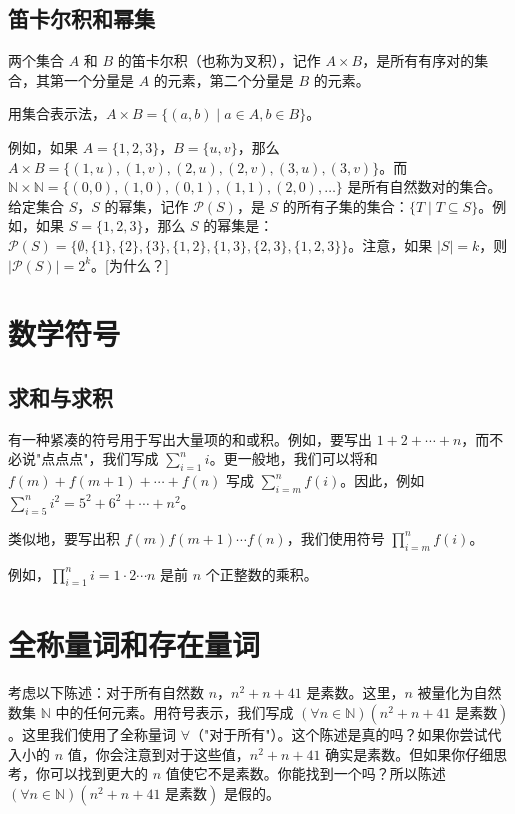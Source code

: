 \documentclass[11pt]{article}
\begin{document}
\subsection*{笛卡尔积和幂集}

两个集合 $A$ 和 $B$ 的笛卡尔积（也称为叉积），记作 $A \times B$，是所有有序对的集合，其第一个分量是 $A$ 的元素，第二个分量是 $B$ 的元素。

用集合表示法，$A \times B = \{(a, b) \mid a \in A, b \in B\}$。

例如，如果 $A = \{1, 2, 3\}$，$B = \{u, v\}$，那么 $A \times B = \{(1, u), (1, v), (2, u), (2, v), (3, u), (3, v)\}$。而 $\mathbb{N} \times \mathbb{N} = \{(0, 0), (1, 0), (0, 1), (1, 1), (2, 0), \ldots\}$ 是所有自然数对的集合。给定集合 $S$，$S$ 的幂集，记作 $\mathcal{P}(S)$，是 $S$ 的所有子集的集合：$\{T \mid T \subseteq S\}$。例如，如果 $S = \{1, 2, 3\}$，那么 $S$ 的幂集是：$\mathcal{P}(S) = \{\emptyset, \{1\}, \{2\}, \{3\}, \{1, 2\}, \{1, 3\}, \{2, 3\}, \{1, 2, 3\}\}$。注意，如果 $|S| = k$，则 $|\mathcal{P}(S)| = 2^k$。[为什么？]

\section{数学符号}

\subsection*{求和与求积}

有一种紧凑的符号用于写出大量项的和或积。例如，要写出 $1 + 2 + \cdots + n$，而不必说"点点点"，我们写成 $\sum_{i=1}^{n} i$。更一般地，我们可以将和 $f(m) + f(m+1) + \cdots + f(n)$ 写成 $\sum_{i=m}^{n} f(i)$。因此，例如 $\sum_{i=5}^{n} i^2 = 5^2 + 6^2 + \cdots + n^2$。

类似地，要写出积 $f(m)f(m+1)\cdots f(n)$，我们使用符号 $\prod_{i=m}^{n} f(i)$。

例如，$\prod_{i=1}^{n} i = 1 \cdot 2 \cdots n$ 是前 $n$ 个正整数的乘积。

\section{全称量词和存在量词}

考虑以下陈述：对于所有自然数 $n$，$n^2 + n + 41$ 是素数。这里，$n$ 被量化为自然数集 $\mathbb{N}$ 中的任何元素。用符号表示，我们写成 $(\forall n \in \mathbb{N})(n^2 + n + 41 \text{ 是素数})$。这里我们使用了全称量词 $\forall$（"对于所有"）。这个陈述是真的吗？如果你尝试代入小的 $n$ 值，你会注意到对于这些值，$n^2 + n + 41$ 确实是素数。但如果你仔细思考，你可以找到更大的 $n$ 值使它不是素数。你能找到一个吗？所以陈述 $(\forall n \in \mathbb{N})(n^2 + n + 41 \text{ 是素数})$ 是假的。
\end{document}
